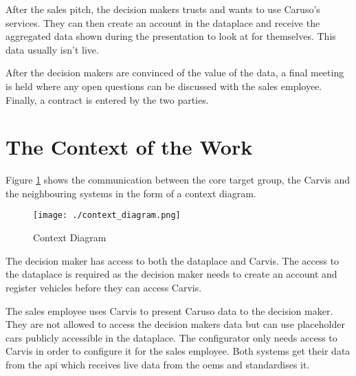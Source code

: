After the sales pitch, the decision makers trusts and wants to use Caruso's services. They can then create an account in the \gls{dataplace} and receive the aggregated data shown during the presentation to look at for themselves. This data usually isn't live.

After the decision makers are convinced of the value of the data, a final meeting is held where any open questions can be discussed with the sales employee. Finally, a contract is entered by the two parties.

\section{The Context of the Work}
Figure \ref*{ScopeOfWork:ContextDiagram} shows the communication between the core target group, the Carvis and the neighbouring systems in the form of a context diagram.

\begin{figure}[ht]
  \centering
  \texttt{[image: ./context\_diagram.png]}
  \caption{Context Diagram}
  \label{ScopeOfWork:ContextDiagram}
\end{figure}

The decision maker has access to both the \gls{dataplace} and Carvis. The access to the \gls{dataplace} is required as the decision maker needs to create an account and register vehicles before they can access Carvis.

The sales employee uses Carvis to present Caruso data to the decision maker. They are not allowed to access the decision makers data but can use placeholder cars publicly accessible in the \gls{dataplace}. The configurator only needs access to Carvis in order to configure it for the sales employee. Both systems get their data from the \gls{api} which receives live data from the \glspl{oem} and standardises it.
